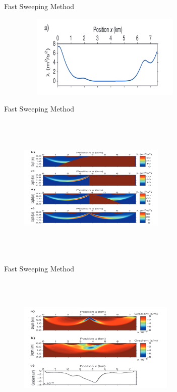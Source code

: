 \documentclass{beamer}
\begin{document}
 \begin{frame}{Fast Sweeping Method}
  \centering
  \begin{figure}
   \includegraphics[width=8.5cm,height=4cm]{figuras/imag3.png}
  \end{figure}
 \end{frame}
 
 \begin{frame}{Fast Sweeping Method}
  \centering
  \begin{figure}
   \includegraphics[width=7cm,height=7cm]{figuras/imag4.png}
  \end{figure}
 \end{frame}

 \begin{frame}{Fast Sweeping Method}
  \centering
  \begin{figure}
   \includegraphics[width=7.5cm,height=7cm]{figuras/imag5.png}
  \end{figure}
 \end{frame}
 
\end{document}
